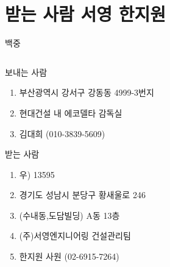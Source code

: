 \documentclass[aspectratio=1610,12pt,xcolor=pdftex,dvipsnames,table,handout]{beamer}
\begin{document}
		\section{받는 사람 서영 한지원}
		\begin{frame}[c,plain]{백중}

		\begin{columns}[t]
		\begin{column}{0.6\textwidth}

			\begin{block} {보내는 사람}
			\begin{enumerate}
			\item [] 부산광역시 강서구 강동동 4999-3번지
			\item [] 현대건설 내 에코델타 감독실
			\item [] 김대희 (010-3839-5609)
			\end{enumerate}
			\end{block}


			\begin{block} {받는 사람}
			\begin{enumerate}
			\item [] 우) 13595
			\item [] 경기도 성남시 분당구 황새울로 246
			\item []  (수내동,도담빌딩) A동 13층
			\item [] (주)서영엔지니어링 건설관리팀
			\item [] 한지원 사원 (02-6915-7264)
			\end{enumerate}
			\end{block}

		\end{column}

		\end{columns}
		\null
		\end{frame}
\end{document}

